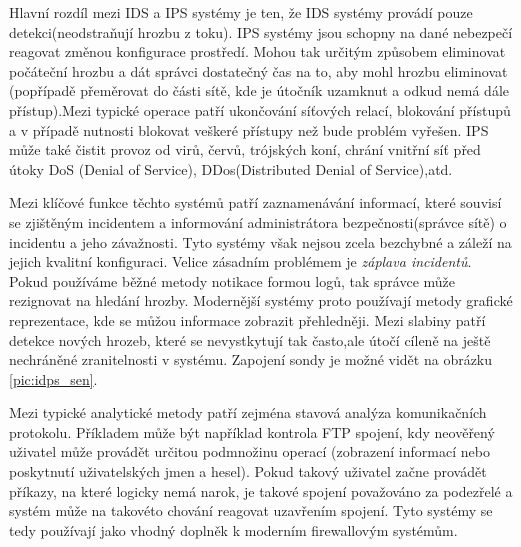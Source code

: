 \documentclass[11pt,twoside,a4paper]{article}
\begin{document}
Hlavní rozdíl mezi IDS a IPS systémy je ten, že IDS systémy provádí pouze detekci(neodstraňují hrozbu z toku). IPS systémy jsou schopny na dané nebezpečí reagovat změnou konfigurace prostředí. Mohou tak určitým způsobem eliminovat počáteční hrozbu a dát správci dostatečný čas na to, aby mohl hrozbu eliminovat (popřípadě přeměrovat do části sítě, kde je útočník uzamknut a odkud nemá dále přístup).Mezi typické operace patří ukončování síťových relací, blokování přístupů a v případě nutnosti blokovat veškeré přístupy než bude problém vyřešen. IPS může také čistit provoz od virů, červů, trójských koní, chrání vnitřní síť před útoky DoS (Denial of Service), DDos(Distributed Denial of Service),atd.

Mezi klíčové funkce těchto systémů patří zaznamenávání informací, které souvisí se zjištěným incidentem a informování administrátora bezpečnosti(správce sítě) o incidentu a jeho závažnosti. Tyto systémy však nejsou zcela bezchybné a záleží na jejich kvalitní konfiguraci. Velice zásadním problémem je \textit{záplava incidentů}. Pokud používáme běžné metody notikace formou logů, tak správce může rezignovat na hledání hrozby. Modernější systémy proto používají metody grafické reprezentace, kde se můžou informace zobrazit přehledněji. Mezi slabiny patří detekce nových hrozeb, které se nevystkytují tak často,ale útočí cíleně na ještě nechráněné zranitelnosti v systému. Zapojení sondy je možné vidět na obrázku \ref{pic:idps_sen}.

Mezi typické analytické metody patří zejména stavová analýza komunikačních protokolu. Příkladem může být například kontrola FTP spojení, kdy neověřený uživatel může provádět určitou podmnožinu operací (zobrazení informací nebo poskytnutí uživatelských jmen a hesel). Pokud takový uživatel začne provádět příkazy, na které logicky nemá narok, je takové spojení považováno za podezřelé a systém může na takovéto chování reagovat uzavřením spojení. Tyto systémy se tedy používají jako vhodný doplněk k moderním firewallovým systémům.
\end{document}
